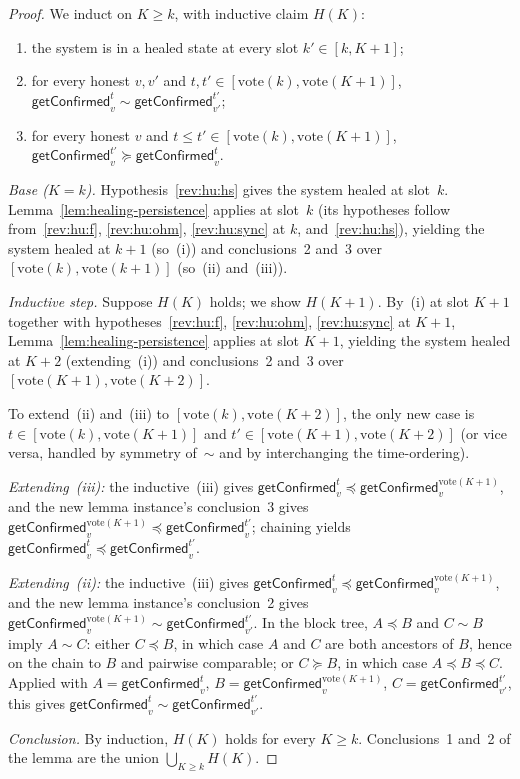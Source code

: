 \documentclass{article}
\newcommand{\vote}{\ensuremath{\mathrm{vote}}}
\newcommand{\getConfirmed}{\textsf{getConfirmed}\xspace}
\theoremstyle{plain}
\theoremstyle{definition}
\theoremstyle{remark}
\begin{document}
\begin{proof}
We induct on $K \geq k$, with inductive claim $H(K)$:
\begin{enumerate}
  \item the system is in a healed state at every slot $k' \in [k, K{+}1]$;
  \item for every honest $v, v'$ and $t, t' \in [\vote(k), \vote(K{+}1)]$, $\getConfirmed_v^t \sim \getConfirmed_{v'}^{t'}$;
  \item for every honest $v$ and $t \leq t' \in [\vote(k), \vote(K{+}1)]$, $\getConfirmed_v^{t'} \succeq \getConfirmed_v^t$.
\end{enumerate}

\emph{Base ($K = k$).}
Hypothesis~\ref{rev:hu:hs} gives the system healed at slot~$k$.
Lemma~\ref{lem:healing-persistence} applies at slot~$k$ (its hypotheses follow from~\ref{rev:hu:f}, \ref{rev:hu:ohm}, \ref{rev:hu:sync} at $k$, and~\ref{rev:hu:hs}), yielding the system healed at $k+1$ (so~(i)) and conclusions~2 and~3 over $[\vote(k), \vote(k{+}1)]$ (so~(ii) and~(iii)).

\emph{Inductive step.}
Suppose $H(K)$ holds; we show $H(K{+}1)$.
By~(i) at slot $K{+}1$ together with hypotheses~\ref{rev:hu:f}, \ref{rev:hu:ohm}, \ref{rev:hu:sync} at $K{+}1$, Lemma~\ref{lem:healing-persistence} applies at slot $K{+}1$, yielding the system healed at $K{+}2$ (extending~(i)) and conclusions~2 and~3 over $[\vote(K{+}1), \vote(K{+}2)]$.

To extend~(ii) and~(iii) to $[\vote(k), \vote(K{+}2)]$, the only new case is $t \in [\vote(k), \vote(K{+}1)]$ and $t' \in [\vote(K{+}1), \vote(K{+}2)]$ (or vice versa, handled by symmetry of~$\sim$ and by interchanging the time-ordering).

\emph{Extending~(iii):}
the inductive~(iii) gives $\getConfirmed_v^t \preceq \getConfirmed_v^{\vote(K{+}1)}$, and the new lemma instance's conclusion~3 gives $\getConfirmed_v^{\vote(K{+}1)} \preceq \getConfirmed_v^{t'}$;
chaining yields $\getConfirmed_v^t \preceq \getConfirmed_v^{t'}$.

\emph{Extending~(ii):}
the inductive~(iii) gives $\getConfirmed_v^t \preceq \getConfirmed_v^{\vote(K{+}1)}$, and the new lemma instance's conclusion~2 gives $\getConfirmed_v^{\vote(K{+}1)} \sim \getConfirmed_{v'}^{t'}$.
In the block tree, $A \preceq B$ and $C \sim B$ imply $A \sim C$:
either $C \preceq B$, in which case $A$ and $C$ are both ancestors of $B$, hence on the chain to $B$ and pairwise comparable;
or $C \succeq B$, in which case $A \preceq B \preceq C$.
Applied with $A = \getConfirmed_v^t$, $B = \getConfirmed_v^{\vote(K{+}1)}$, $C = \getConfirmed_{v'}^{t'}$, this gives $\getConfirmed_v^t \sim \getConfirmed_{v'}^{t'}$.

\emph{Conclusion.}
By induction, $H(K)$ holds for every $K \geq k$. Conclusions~1 and~2 of the lemma are the union $\bigcup_{K \geq k} H(K)$.
\end{proof}
\end{document}
